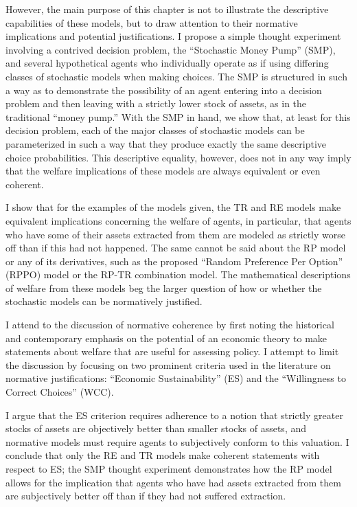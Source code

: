 \documentclass[../main.tex]{subfiles}
\begin{document}
However, the main purpose of this chapter is not to illustrate the descriptive capabilities of these models, but to draw attention to their normative implications and potential justifications.
I propose a simple thought experiment involving a contrived decision problem, the \enquote{Stochastic Money Pump} (SMP), and several hypothetical agents who individually operate as if using differing classes of stochastic models when making choices.
The SMP is structured in such a way as to demonstrate the possibility of an agent entering into a decision problem and then leaving with a strictly lower stock of assets, as in the traditional \enquote{money pump.}
With the SMP in hand, we show that, at least for this decision problem, each of the major classes of stochastic models can be parameterized in such a way that they produce exactly the same descriptive choice probabilities.
This descriptive equality, however, does not in any way imply that the welfare implications of these models are always equivalent or even coherent.

I show that for the examples of the models given, the TR and RE models make equivalent implications concerning the welfare of agents, in particular, that agents who have some of their assets extracted from them are modeled as strictly worse off than if this had not happened.
The same cannot be said about the RP model or any of its derivatives, such as the proposed \enquote{Random Preference Per Option} (RPPO) model or the RP-TR combination model.
The mathematical descriptions of welfare from these models beg the larger question of how or whether the stochastic models can be normatively justified.

I attend to the discussion of normative coherence by first noting the historical and contemporary emphasis on the potential of an economic theory to make statements about welfare that are useful for assessing policy.
I attempt to limit the discussion by focusing on two prominent criteria used in the literature on normative justifications: \enquote{Economic Sustainability} (ES) and the \enquote{Willingness to Correct Choices} (WCC).

I argue that the ES criterion requires adherence to a notion that strictly greater stocks of assets are objectively better than smaller stocks of assets, and normative models must require agents to subjectively conform to this valuation.
I conclude that only the RE and TR models make coherent statements with respect to ES; the SMP thought experiment demonstrates how the RP model allows for the implication that agents who have had assets extracted from them are subjectively better off than if they had not suffered extraction.
\end{document}
